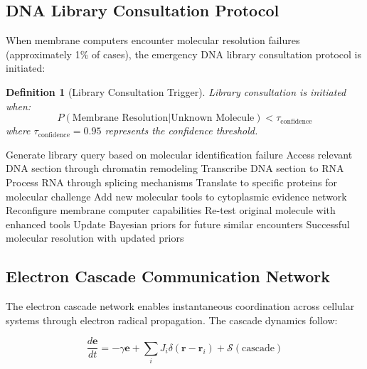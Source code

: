 \documentclass[12pt,a4paper]{article}
\newtheorem{definition}{Definition}
\begin{document}
\subsection{DNA Library Consultation Protocol}

When membrane computers encounter molecular resolution failures (approximately 1\% of cases), the emergency DNA library consultation protocol is initiated:

\begin{definition}[Library Consultation Trigger]
Library consultation is initiated when:
\begin{equation}
P(\text{Membrane Resolution}|\text{Unknown Molecule}) < \tau_{\text{confidence}}
\end{equation}
where $\tau_{\text{confidence}} = 0.95$ represents the confidence threshold.
\end{definition}

\begin{algorithm}
\caption{DNA Library Emergency Resolution}
\begin{algorithmic}
    \State Generate library query based on molecular identification failure
    \State Access relevant DNA section through chromatin remodeling
    \State Transcribe DNA section to RNA
    \State Process RNA through splicing mechanisms
    \State Translate to specific proteins for molecular challenge
    \State Add new molecular tools to cytoplasmic evidence network
    \State Reconfigure membrane computer capabilities
    \State Re-test original molecule with enhanced tools
    \State Update Bayesian priors for future similar encounters
    \State \Return Successful molecular resolution with updated priors
\EndProcedure
\end{algorithmic}
\end{algorithm}

\subsection{Electron Cascade Communication Network}

The electron cascade network enables instantaneous coordination across cellular systems through electron radical propagation. The cascade dynamics follow:

\begin{equation}
\frac{d\mathbf{e}}{dt} = -\gamma \mathbf{e} + \sum_i J_i \delta(\mathbf{r} - \mathbf{r}_i) + \mathcal{S}(\text{cascade})
\end{equation}
\end{document}
